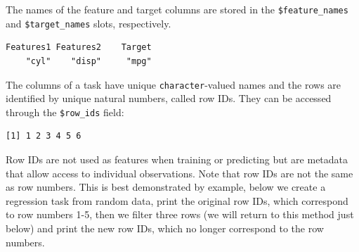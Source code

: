 The names of the feature and target columns are stored in the
\texttt{\$feature\_names} and \texttt{\$target\_names} slots,
respectively.

\begin{Shaded}
\begin{Highlighting}[]
\NormalTok{(}\SpecialCharTok{$}
  \SpecialCharTok{$}
\end{Highlighting}
\end{Shaded}

\begin{verbatim}
Features1 Features2    Target 
    "cyl"    "disp"     "mpg" 
\end{verbatim}

The columns of a task have unique \texttt{character}-valued names and
the rows are identified by unique natural numbers, called row IDs. They
can be accessed through the \texttt{\$row\_ids} field:

\begin{Shaded}
\begin{Highlighting}[]
\SpecialCharTok{$}
\end{Highlighting}
\end{Shaded}

\begin{verbatim}
[1] 1 2 3 4 5 6
\end{verbatim}

Row IDs are not used as features when training or predicting but are
metadata that allow access to individual observations. Note that row IDs
are not the same as row numbers. This is best demonstrated by example,
below we create a regression task from random data, print the original
row IDs, which correspond to row numbers 1-5, then we filter three rows
(we will return to this method just below) and print the new row IDs,
which no longer correspond to the row numbers.

\begin{Shaded}
\begin{Highlighting}[]
\OtherTok{=} \NormalTok{(}\NormalTok{(} \NormalTok{(}\NormalTok{), } \NormalTok{(}\NormalTok{)),}
   \NormalTok{)}
\SpecialCharTok{$}
\end{Highlighting}
\end{Shaded}

